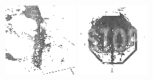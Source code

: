 \documentclass{article}
\begin{document}
\begin{figure}[t]
\begin{minipage}[c]{.21\linewidth}
  \end{minipage}
  \begin{minipage}[c]{.21\linewidth}
    \centering\centerline{\includegraphics[width=\linewidth]{imgs/dennis_cal/saxophone/sums/100_200.png}}
  \end{minipage}
  \begin{minipage}[c]{.21\linewidth}
    \centering\centerline{\includegraphics[width=\linewidth]{imgs/dennis_cal/stop/sums/100_200.png}}

\end{minipage}
\end{figure}
\end{document}
